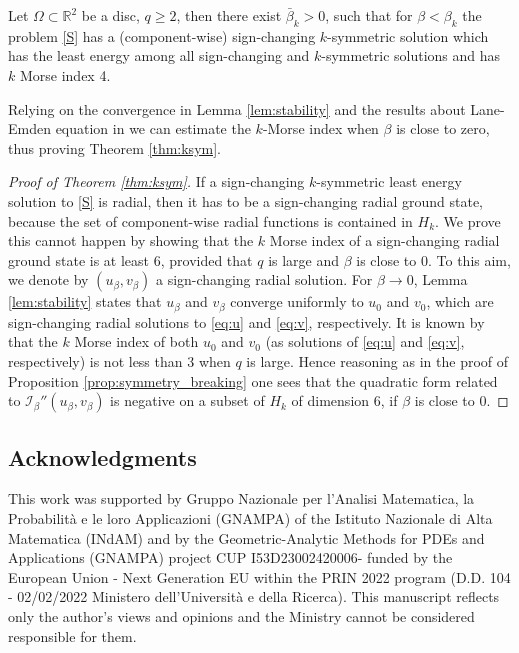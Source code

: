 \documentclass[reqno]{amsart}
\begin{document}
 \begin{proposition}\label{prop:existence_radial}
Let $\Omega\subset \mathbb{R}^2$ be a disc, $q\ge 2$, then there exist $\bar \beta_k>0$,
such that for $\beta<\beta_k$ the problem \eqref{S} has
a (component-wise) sign-changing  $k$-symmetric  solution which has the least
energy among all sign-changing and $k$-symmetric solutions and  has $k$ Morse index 4.
 \end{proposition}

Relying on the convergence in Lemma \ref{lem:stability} and the results about
Lane-Emden equation in \cite{GlaIan23Nodea}
we can estimate the $k$-Morse index when $\beta$ is close to zero, thus proving
 Theorem \ref{thm:ksym}.

\begin{proof}[Proof of Theorem \ref{thm:ksym}]
If a sign-changing $k$-symmetric least energy solution to \eqref{S}
is radial, then it has to be a sign-changing radial ground state, because the set
of component-wise radial functions is contained in  $H_{k}$.
We prove this cannot happen by showing that the $k$ Morse index of a sign-changing radial
ground state is at least $6$, provided that $q$ is large  and $\beta$ is close to $0$.
To this aim, we denote by $(u_{\beta}, v_{\beta})$ a sign-changing radial solution.
For $\beta\to 0$,  Lemma \ref{lem:stability} states that  $u_{\beta}$ and $v_{\beta}$
converge uniformly to $u_0$ and $v_0$,  which are sign-changing radial  solutions
to \eqref{eq:u} and \eqref{eq:v}, respectively.
It is known by \cite[Proposition 6.5]{GlaIan23Nodea} that  the $k$ Morse index of both
$u_0$ and $v_0$ (as solutions of \eqref{eq:u} and \eqref{eq:v}, respectively) is not
less than $3$ when $q$ is large.
Hence reasoning as in the proof of Proposition \ref{prop:symmetry_breaking} one sees
that the quadratic form related to $ \mathcal I_{\beta}''(u_{\beta}, v_{\beta})$
is negative on a subset of $H_k$ of dimension $6$, if $\beta$ is close to $0$.
\end{proof}

\subsection*{Acknowledgments}
This work was  supported by Gruppo Nazionale per l'Analisi Matematica,
la Probabilit\`a e le loro Applicazioni (GNAMPA) of the Istituto Nazionale di
Alta Matematica (INdAM) and by the
Geometric-Analytic Methods for PDEs and Applications (GNAMPA)
project CUP I53D23002420006- funded by the European Union -
Next Generation EU within the PRIN 2022 program
(D.D. 104 - 02/02/2022 Ministero dell'Universit\`a e della Ricerca).
This manuscript reflects only the author's views and opinions and the Ministry
cannot be considered responsible for them.
\end{document}
